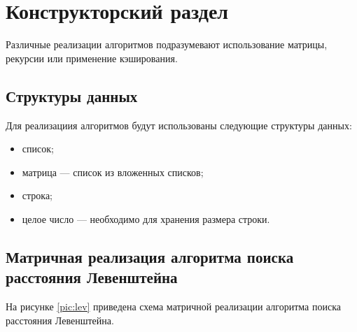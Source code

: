 \chapter{Конструкторский раздел}

Различные реализации алгоритмов подразумевают использование матрицы, рекурсии или применение кэширования.

\section{Структуры данных}

Для реализациия алгоритмов будут использованы следующие структуры данных:
\begin{itemize}
	\item список;
	\item матрица --- список из вложенных списков;
	\item строка;
	\item целое число --- необходимо для хранения размера строки.
\end{itemize}

\section{Матричная реализация алгоритма поиска расстояния Левенштейна}

На рисунке \ref{pic:lev} приведена схема матричной реализации алгоритма поиска расстояния Левенштейна.

\newpage

